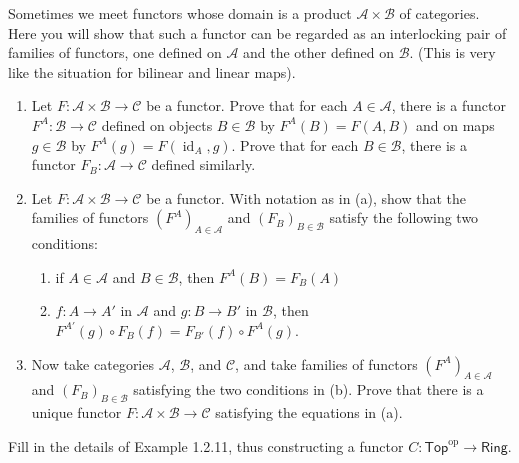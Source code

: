 \documentclass[12 pt, letterpaper]{hmcpset}
\begin{document}
\begin{problem}[1.2.25]
	Sometimes we meet functors whose domain is a product $\mathscr{A} \times \mathscr{B}$ of categories. Here you will show that such a functor can be regarded as an interlocking pair of families of functors, one defined on $\mathscr{A}$ and the other defined on $\mathscr{B}$. (This is very like the situation for bilinear and linear maps).
	\begin{enumerate}
		\item Let $F : \mathscr{A} \times \mathscr{B} \to \mathscr{C}$ be a functor. Prove that for each $A \in \mathscr{A}$, there is a functor $F^{A} : \mathscr{B} \to \mathscr{C}$ defined on objects $B \in \mathscr{B}$ by $F^{A}(B) = F(A, B)$ and on maps $g \in \mathscr{B}$ by $F^{A}(g) = F(\operatorname{id}_{A}, g)$. Prove that for each $B \in \mathscr{B}$, there is a functor $F_{B} : \mathscr{A} \to \mathscr{C}$ defined similarly.
		\item Let $F : \mathscr{A} \times \mathscr{B} \to \mathscr{C}$ be a functor. With notation as in (a), show that the families of functors $(F^{A})_{A \in \mathscr{A}}$ and $(F_{B})_{B \in \mathscr{B}}$ satisfy the following two conditions:
			\begin{enumerate}[label = (\roman*)]
				\item if $A \in \mathscr{A}$ and $B \in \mathscr{B}$, then $F^{A}(B) = F_{B}(A)$ 
				\item $f : A \to A'$ in $\mathscr{A}$ and $g : B \to B'$ in $\mathscr{B}$, then $F^{A'}(g) \circ F_{B}(f) = F_{B'}(f) \circ F^{A}(g)$.
			\end{enumerate}
		\item Now take categories $\mathscr{A}$, $\mathscr{B}$, and $\mathscr{C}$, and take families of functors $(F^{A})_{A \in \mathscr{A}}$ and $(F_{B})_{B \in \mathscr{B}}$ satisfying the two conditions in (b). Prove that there is a unique functor $F : \mathscr{A} \times \mathscr{B} \to \mathscr{C}$ satisfying the equations in (a).
	\end{enumerate}
\end{problem}

\pagebreak

\begin{problem}[1.2.26]
	Fill in the details of Example 1.2.11, thus constructing a functor  $C : \mathsf{Top}^{\text{op}} \to \mathsf{Ring}$.
\end{problem}
\end{document}
